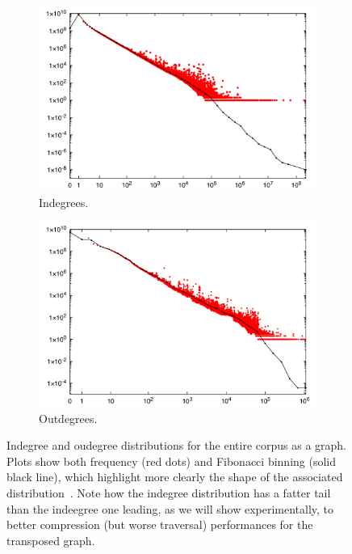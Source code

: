 \begin{figure}
    \centering
    \begin{subfigure}[b]{.49\textwidth}
        \centering
        \includegraphics[width=\linewidth]{img/compression/indegree.png}
        \caption{Indegrees.}%
        \label{fig:compression-indegree}
    \end{subfigure}\hfill
    \begin{subfigure}[b]{.49\textwidth}
        \centering
        \includegraphics[width=\linewidth]{img/compression/outdegree.png}
        \caption{Outdegrees.}%
        \label{fig:compression-outdegree}
    \end{subfigure}
    \caption{Indegree and oudegree distributions for the entire corpus as a
    graph. Plots show both frequency (red dots) and Fibonacci binning (solid
    black line), which highlight more clearly the shape of the associated
    distribution~\cite{VigFB}. Note how the indegree distribution has a fatter
    tail than the indeegree one leading, as we will show experimentally, to
    better compression (but worse traversal) performances for the transposed
    graph.}%
    \label{fig:compression-inoutdegree}
\end{figure}

